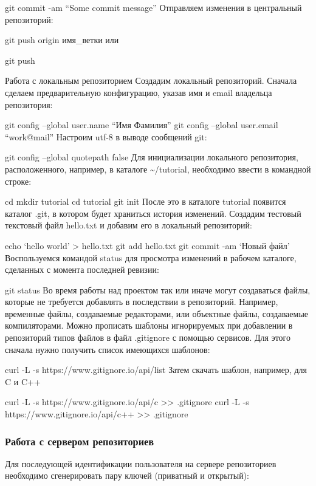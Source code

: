 \documentclass[
  english,
  russian,
  12pt,
  a4paper,
  DIV=11,
  numbers=noendperiod]{scrreprt}
\begin{document}
git commit -am \enquote{Some commit message} Отправляем изменения в
центральный репозиторий:

git push origin имя\_ветки или

git push

Работа с локальным репозиторием Создадим локальный репозиторий. Сначала
сделаем предварительную конфигурацию, указав имя и email владельца
репозитория:

git config --global user.name \enquote{Имя Фамилия} git config --global
user.email \enquote{work@mail} Настроим utf-8 в выводе сообщений git:

git config --global quotepath false Для инициализации локального
репозитория, расположенного, например, в каталоге
\textasciitilde/tutorial, необходимо ввести в командной строке:

cd mkdir tutorial cd tutorial git init После это в каталоге tutorial
появится каталог .git, в котором будет храниться история изменений.
Создадим тестовый текстовый файл hello.txt и добавим его в локальный
репозиторий:

echo \enquote*{hello world} \textgreater{} hello.txt git add hello.txt
git commit -am \enquote*{Новый файл} Воспользуемся командой status для
просмотра изменений в рабочем каталоге, сделанных с момента последней
ревизии:

git status Во время работы над проектом так или иначе могут создаваться
файлы, которые не требуется добавлять в последствии в репозиторий.
Например, временные файлы, создаваемые редакторами, или объектные файлы,
создаваемые компиляторами. Можно прописать шаблоны игнорируемых при
добавлении в репозиторий типов файлов в файл .gitignore с помощью
сервисов. Для этого сначала нужно получить список имеющихся шаблонов:

curl -L -s https://www.gitignore.io/api/list Затем скачать шаблон,
например, для C и C++

curl -L -s https://www.gitignore.io/api/c \textgreater\textgreater{}
.gitignore curl -L -s https://www.gitignore.io/api/c++
\textgreater\textgreater{} .gitignore

\subsubsection{Работа с сервером
репозиториев}\label{ux440ux430ux431ux43eux442ux430-ux441-ux441ux435ux440ux432ux435ux440ux43eux43c-ux440ux435ux43fux43eux437ux438ux442ux43eux440ux438ux435ux432}

Для последующей идентификации пользователя на сервере репозиториев
необходимо сгенерировать пару ключей (приватный и открытый):
\end{document}
